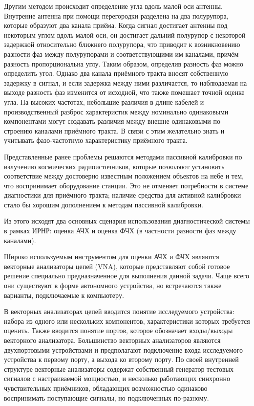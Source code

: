 \documentclass{report}
\begin{document}
Другим методом происходит определение угла вдоль малой оси антенны. Внутренне антенна при помощи перегородки разделена на два полурупора, которые образуют два канала приёма. Когда сигнал достигает антенны под некоторым углом вдоль малой оси, он достигает дальний полурупор с некоторой задержкой относительно ближнего полурупора, что приводит к возникновению разности фаз между полурупорами и соответствующими им каналами, причём разность пропорциональна углу. Таким образом, определив разность фаз можно определить угол. Однако два канала приёмного тракта вносят собственную задержку в сигнал, и если задержка между ними различается, то наблюдаемая на выходе разность фаз изменится от исходной, что также помешает точной оценке угла. На высоких частотах, небольшие различия в длине кабелей и производственный разброс характеристик между номинально одинаковыми компонентами могут создавать различия между внешне одинаковыми по строению каналами приёмного тракта. В связи с этим желательно знать и учитывать фазо-частотную характеристику приёмного тракта.

Представленные ранее проблемы решаются методами пассивной калибровки по излучению космических радиоисточников, которые позволяют установить соответствие между достоверно известным положением объектов на небе и тем, что воспринимает оборудование станции. Это не отменяет потребности в системе диагностики для приёмного тракта; наличие средства для активной калибровки стало бы хорошим дополнением к методам пассивной калибровки.

Из этого исходят два основных сценария использования диагностической системы в рамках ИРНР: оценка АЧХ и оценка ФЧХ (в частности разности фаз между каналами).

Широко используемым инструментом для оценки АЧХ и ФЧХ являются векторные анализаторы цепей (VNA), которые представляют собой готовое решение специально предназначенное для выполнения данной задачи. Чаще всего они существуют в форме автономного устройства, но встречаются также варианты, подключаемые к компьютеру.

В векторных анализаторах цепей вводится понятие исследуемого устройства: набора из одного или нескольких компонентов, характеристики которых требуется оценить. Также вводится понятие портов, которое обозначает входы/выходы векторного анализатора. Большинство векторных анализаторов являются двухпортовыми устройствами и предполагают подключение входа исследуемого устройства к первому порту, а выхода ко второму порту. По своей внутренней структуре векторные анализаторы содержат собственный генератор тестовых сигналов с настраиваемой мощностью, и несколько работающих синхронно чувствительных приёмников, обладающих возможностью одинаково воспринимать поступающие сигналы, но подключенных по-разному.
\end{document}
